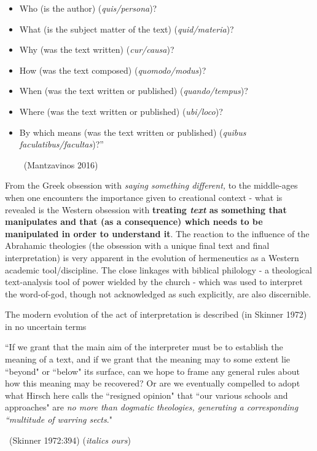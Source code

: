 \begin{itemize}
\itemsep=0pt
\item Who (is the author) (\textit{quis/persona})?

 \item What (is the subject matter of the text) (\textit{quid/materia})?

 \item Why (was the text written) (\textit{cur/causa})?

 \item How (was the text composed) (\textit{quomodo/modus})?

 \item When (was the text written or published) (\textit{quando/tempus})?

 \item Where (was the text written or published) (\textit{ubi/loco})?

 \item By which means (was the text written or published) (\textit{quibus faculatibus/facultas})?”

~\hfill (Mantzavinos 2016)

\end{itemize}

From the Greek obsession with \textit{saying something different,} to the middle-ages when one encounters the importance given to creational context - what is revealed is the Western obsession with \textbf{treating \textit{text} as something that manipulates and that (as a consequence) which needs to be manipulated in order to understand it}. The reaction to the influence of the Abrahamic theologies (the obsession with a unique final text and final interpretation) is very apparent in the evolution of hermeneutics as a Western academic tool/discipline. The close linkages with biblical philology - a theological text-analysis tool of power wielded by the church - which was used to interpret the word-of-god, though not acknowledged as such explicitly, are also discernible.

The modern evolution of the act of interpretation is described (in Skinner 1972) in no uncertain terms

\begin{myquote}
“If we grant that the main aim of the interpreter must be to establish the meaning of a text, and if we grant that the meaning may to some extent lie “beyond" or “below" its surface, can we hope to frame any general rules about how this meaning may be recovered? Or are we eventually compelled to adopt what Hirsch here calls the “resigned opinion" that “our various schools and approaches" are \textit{no more than dogmatic theologies, generating a corresponding “multitude of warring sects}."

~\hfill (Skinner 1972:394) (\textit{italics ours})
\end{myquote}

